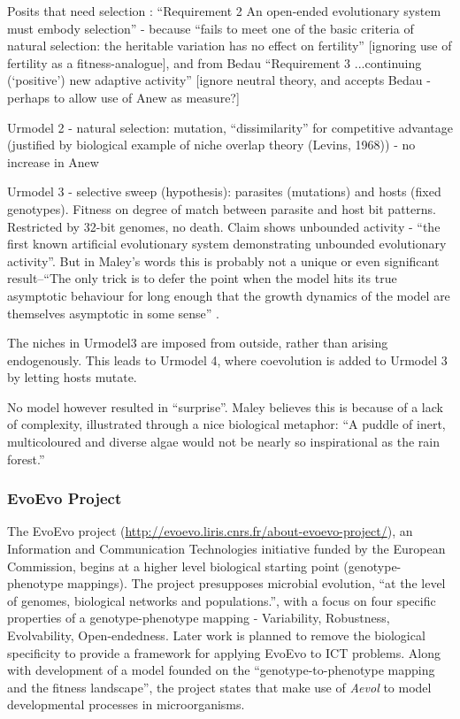 Posits that need selection : ``Requirement 2 An open-ended evolutionary system must embody selection'' - because ``fails to meet one of the basic criteria of natural selection: the heritable variation has no effect on fertility'' {[}ignoring use of fertility as a fitness-analogue{]}, and from Bedau ``Requirement 3 ...continuing (`positive') new adaptive activity'' {[}ignore neutral theory, and accepts Bedau - perhaps to allow use of Anew as measure?{]}

Urmodel 2 - natural selection: mutation, ``dissimilarity'' for competitive advantage (justified by biological example of niche overlap theory (Levins, 1968)) - no increase in Anew

Urmodel 3 - selective sweep (hypothesis): parasites (mutations) and hosts (fixed genotypes). Fitness on degree of match between parasite and host bit patterns. Restricted by 32-bit genomes, no death. Claim shows unbounded activity - ``the first known artificial evolutionary system demonstrating unbounded evolutionary activity''. But in Maley's words this is probably not a unique or even significant result--``The only trick is to defer the point when the model hits its true asymptotic behaviour for long enough that the growth dynamics of the model are themselves asymptotic in some sense'' \parencite{Maley1999}.

The niches in Urmodel3 are imposed from outside, rather than arising endogenously. This leads to Urmodel 4, where coevolution is added to Urmodel 3 by letting hosts mutate.
 
No model however resulted in ``surprise''. Maley believes this is because of a lack of complexity, illustrated through a nice biological metaphor: ``A puddle of inert, multicoloured and diverse algae would not be nearly so inspirational as the rain forest.''
	
\subsubsection{EvoEvo Project}
The EvoEvo project (\url{http://evoevo.liris.cnrs.fr/about-evoevo-project/}), an Information and Communication Technologies initiative funded by the European Commission, begins at a higher level biological starting point (genotype-phenotype mappings). The project presupposes microbial evolution, ``at the level of genomes, biological networks and populations.'', with a focus on four specific properties of a genotype-phenotype mapping - Variability, Robustness, Evolvability, Open-endedness. Later work is planned to remove the biological specificity to provide a framework for applying EvoEvo to ICT problems. Along with development of a model founded on the ``genotype-to-phenotype mapping and the fitness landscape'', the project states that make use of \emph{Aevol} \parencite{Knibbe:2006vn,Knibbe:2007kx} to model developmental processes in microorganisms.

